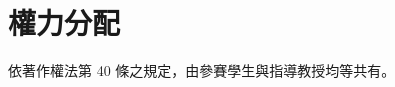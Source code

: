 \documentclass[12pt]{article}
\begin{document}
\section{權力分配}
依著作權法第 40 條之規定，由參賽學生與指導教授均等共有。

\end{document}
